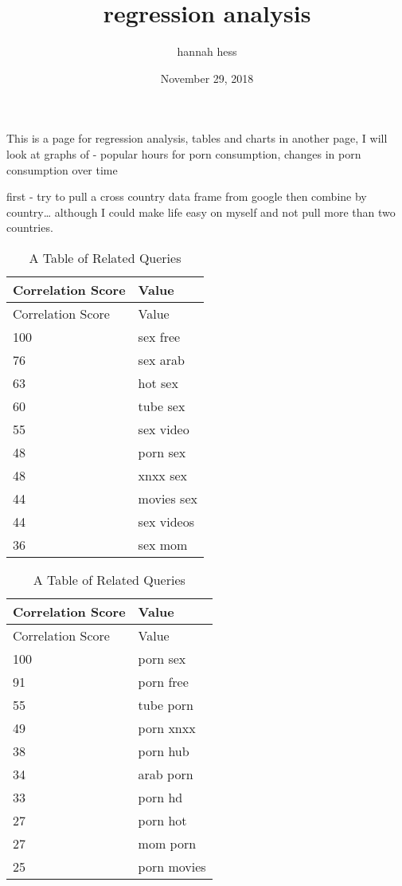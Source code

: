 \documentclass[]{article}
\title{regression analysis}
\author{hannah hess}
\date{November 29, 2018}
\newenvironment{Shaded}{\begin{snugshade}}{\end{snugshade}}
\newcommand{\CommentTok}[1]{\textcolor[rgb]{0.56,0.35,0.01}{\textit{#1}}}
\begin{document}
\maketitle

This is a page for regression analysis, tables and charts in another
page, I will look at graphs of - popular hours for porn consumption,
changes in porn consumption over time

first - try to pull a cross country data frame from google then combine
by country\ldots{} although I could make life easy on myself and not
pull more than two countries.

\begin{longtable}[]{@{}ll@{}}
\caption{A Table of Related Queries}\tabularnewline
\toprule
Correlation Score & Value\tabularnewline
\midrule
\endfirsthead
\toprule
Correlation Score & Value\tabularnewline
\midrule
\endhead
100 & sex free\tabularnewline
76 & sex arab\tabularnewline
63 & hot sex\tabularnewline
60 & tube sex\tabularnewline
55 & sex video\tabularnewline
48 & porn sex\tabularnewline
48 & xnxx sex\tabularnewline
44 & movies sex\tabularnewline
44 & sex videos\tabularnewline
36 & sex mom\tabularnewline
\bottomrule
\end{longtable}

\begin{longtable}[]{@{}ll@{}}
\caption{A Table of Related Queries}\tabularnewline
\toprule
Correlation Score & Value\tabularnewline
\midrule
\endfirsthead
\toprule
Correlation Score & Value\tabularnewline
\midrule
\endhead
100 & porn sex\tabularnewline
91 & porn free\tabularnewline
55 & tube porn\tabularnewline
49 & porn xnxx\tabularnewline
38 & porn hub\tabularnewline
34 & arab porn\tabularnewline
33 & porn hd\tabularnewline
27 & porn hot\tabularnewline
27 & mom porn\tabularnewline
25 & porn movies\tabularnewline
\bottomrule
\end{longtable}

\begin{Shaded}
\end{Shaded}
\end{document}
